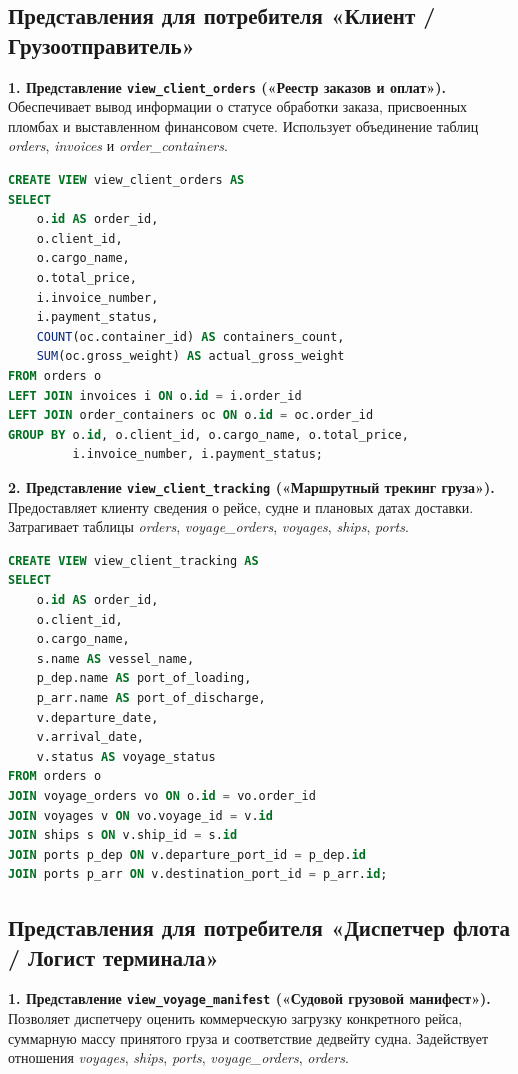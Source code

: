 \documentclass[a4paper,14pt]{article}
\begin{document}
\subsection{Представления для потребителя «Клиент / Грузоотправитель»}

\textbf{1. Представление \texttt{view\_client\_orders} («Реестр заказов и оплат»).}
Обеспечивает вывод информации о статусе обработки заказа, присвоенных пломбах и выставленном финансовом счете. Использует объединение таблиц \textit{orders}, \textit{invoices} и \textit{order\_containers}.

\begin{lstlisting}[language=SQL]
CREATE VIEW view_client_orders AS
SELECT 
    o.id AS order_id,
    o.client_id,
    o.cargo_name,
    o.total_price,
    i.invoice_number,
    i.payment_status,
    COUNT(oc.container_id) AS containers_count,
    SUM(oc.gross_weight) AS actual_gross_weight
FROM orders o
LEFT JOIN invoices i ON o.id = i.order_id
LEFT JOIN order_containers oc ON o.id = oc.order_id
GROUP BY o.id, o.client_id, o.cargo_name, o.total_price, 
         i.invoice_number, i.payment_status;
\end{lstlisting}

\textbf{2. Представление \texttt{view\_client\_tracking} («Маршрутный трекинг груза»).}
Предоставляет клиенту сведения о рейсе, судне и плановых датах доставки. Затрагивает таблицы \textit{orders}, \textit{voyage\_orders}, \textit{voyages}, \textit{ships}, \textit{ports}.

\begin{lstlisting}[language=SQL]
CREATE VIEW view_client_tracking AS
SELECT 
    o.id AS order_id,
    o.client_id,
    o.cargo_name,
    s.name AS vessel_name,
    p_dep.name AS port_of_loading,
    p_arr.name AS port_of_discharge,
    v.departure_date,
    v.arrival_date,
    v.status AS voyage_status
FROM orders o
JOIN voyage_orders vo ON o.id = vo.order_id
JOIN voyages v ON vo.voyage_id = v.id
JOIN ships s ON v.ship_id = s.id
JOIN ports p_dep ON v.departure_port_id = p_dep.id
JOIN ports p_arr ON v.destination_port_id = p_arr.id;
\end{lstlisting}

\subsection{Представления для потребителя «Диспетчер флота / Логист терминала»}

\textbf{1. Представление \texttt{view\_voyage\_manifest} («Судовой грузовой манифест»).}
Позволяет диспетчеру оценить коммерческую загрузку конкретного рейса, суммарную массу принятого груза и соответствие дедвейту судна. Задействует отношения \textit{voyages}, \textit{ships}, \textit{ports}, \textit{voyage\_orders}, \textit{orders}.
\end{document}
